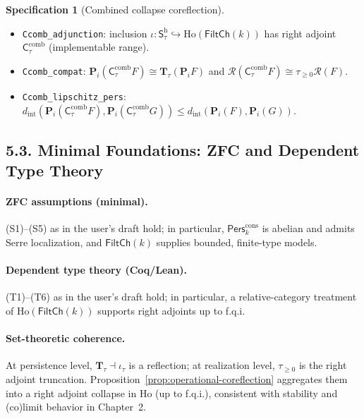 \documentclass[11pt]{article}
\numberwithin{equation}{section}
\theoremstyle{plain}
\theoremstyle{definition}
\theoremstyle{remark}
\theoremstyle{plain}
\theoremstyle{definition}
\numberwithin{equation}{section}
\theoremstyle{definition}
\newtheorem{specification}[theorem]{Specification}
\numberwithin{equation}{section}
\theoremstyle{plain}
\theoremstyle{definition}
\theoremstyle{remark}
\begin{document}
\begin{specification}[Combined collapse coreflection]\label{spec:combined}
\begin{itemize}
  \item \texttt{Ccomb\_adjunction}: inclusion $\iota:\mathsf{S}_\tau^{\mathrm{h}}\hookrightarrow\mathrm{Ho}(\mathsf{FiltCh}(k))$ has right adjoint $\mathsf{C}_\tau^{\mathrm{comb}}$ (implementable range).
  \item \texttt{Ccomb\_compat}: $\mathbf{P}_i(\mathsf{C}_\tau^{\mathrm{comb}}F)\cong \mathbf{T}_\tau(\mathbf{P}_iF)$ and $\mathcal{R}(\mathsf{C}_\tau^{\mathrm{comb}}F)\cong \tau_{\ge 0}\mathcal{R}(F)$.
  \item \texttt{Ccomb\_lipschitz\_pers}: $d_{\mathrm{int}}(\mathbf{P}_i(\mathsf{C}_\tau^{\mathrm{comb}}F),\mathbf{P}_i(\mathsf{C}_\tau^{\mathrm{comb}}G))\le d_{\mathrm{int}}(\mathbf{P}_i(F),\mathbf{P}_i(G))$.
\end{itemize}
\end{specification}

\subsection*{5.3. Minimal Foundations: ZFC and Dependent Type Theory}

\paragraph{ZFC assumptions (minimal).}
(S1)–(S5) as in the user’s draft hold; in particular, $\mathsf{Pers}^{\mathrm{cons}}_k$ is abelian and admits Serre localization, and $\mathsf{FiltCh}(k)$ supplies bounded, finite-type models.

\paragraph{Dependent type theory (Coq/Lean).}
(T1)–(T6) as in the user’s draft hold; in particular, a relative-category treatment of $\mathrm{Ho}(\mathsf{FiltCh}(k))$ supports right adjoints up to f.q.i.

\paragraph{Set-theoretic coherence.}
At persistence level, $\mathbf{T}_\tau\dashv \iota_\tau$ is a reflection; at realization level, $\tau_{\ge 0}$ is the right adjoint truncation. Proposition~\ref{prop:operational-coreflection} aggregates them into a right adjoint collapse in $\mathrm{Ho}$ (up to f.q.i.), consistent with stability and (co)limit behavior in Chapter~2.
\end{document}
